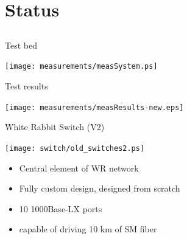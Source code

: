 \documentclass[compress,red]{beamer}
\begin{document}
\section{Status}
\subsection{}
\begin{frame}{Test bed}

    \begin{center}
    \texttt{[image: measurements/measSystem.ps]}
    \end{center}

\end{frame}
\begin{frame}{Test results}

    \begin{center}
    \texttt{[image: measurements/measResults-new.eps]}
    \end{center}


\end{frame}
\begin{frame}{White Rabbit Switch (V2)}

    \begin{center}
    \texttt{[image: switch/old\_switches2.ps]}
    \end{center}

	\begin{itemize}
	\item Central element of WR network
	\item Fully custom design, designed from scratch
	\item 10 1000Base-LX ports
	\item capable of driving 10 km of SM fiber
	\end{itemize}




\end{frame}
\end{document}

